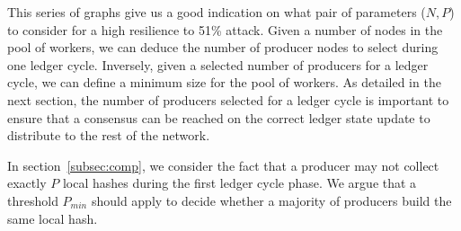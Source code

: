This series of graphs give us a good indication on what pair of parameters ($N,P$) to consider for a high resilience to 51\% attack. Given a number of nodes in the pool of workers, we can deduce the number of producer nodes to select during one ledger cycle. Inversely, given a selected number of producers for a ledger cycle, we can define a minimum size for the pool of workers. As detailed in the next section, the number of producers selected for a ledger cycle is important to ensure that a consensus can be reached on the correct ledger state update to distribute to the rest of the network.

In section~\ref{subsec:comp}, we consider the fact that a producer may not collect exactly $P$ local hashes during the first ledger cycle phase. We argue that a threshold $P_{min}$ should apply to decide whether a majority of producers build the same local hash. 
